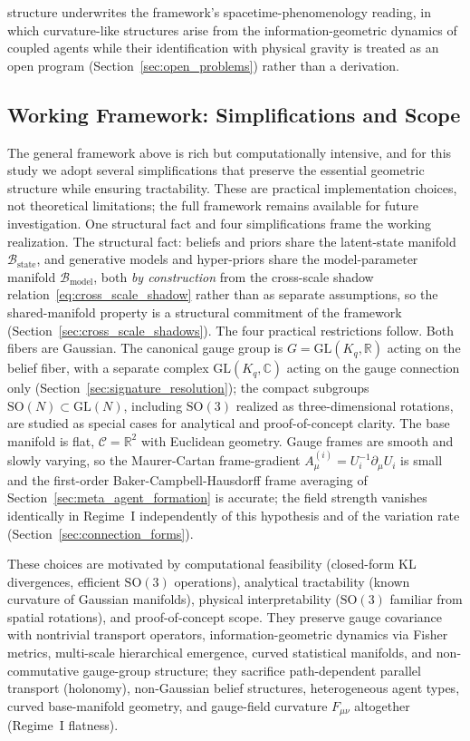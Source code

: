 \documentclass[11pt]{article}
\begin{document}
structure underwrites the framework's spacetime-phenomenology reading, in which curvature-like structures arise from the information-geometric dynamics of coupled agents while their identification with physical gravity is treated as an open program (Section~\ref{sec:open_problems}) rather than a derivation.

\subsection{Working Framework: Simplifications and Scope}
\label{sec:working_framework}

The general framework above is rich but computationally intensive, and for this study we adopt several simplifications that preserve the essential geometric structure while ensuring tractability. These are practical implementation choices, not theoretical limitations; the full framework remains available for future investigation. One structural fact and four simplifications frame the working realization. The structural fact: beliefs and priors share the latent-state manifold $\mathcal{B}_{\mathrm{state}}$, and generative models and hyper-priors share the model-parameter manifold $\mathcal{B}_{\mathrm{model}}$, both \emph{by construction} from the cross-scale shadow relation~\eqref{eq:cross_scale_shadow} rather than as separate assumptions, so the shared-manifold property is a structural commitment of the framework (Section~\ref{sec:cross_scale_shadows}). The four practical restrictions follow. Both fibers are Gaussian. The canonical gauge group is $G = \mathrm{GL}(K_q, \mathbb{R})$ acting on the belief fiber, with a separate complex $\mathrm{GL}(K_q, \mathbb{C})$ acting on the gauge connection only (Section~\ref{sec:signature_resolution}); the compact subgroups $\mathrm{SO}(N) \subset \mathrm{GL}(N)$, including $\mathrm{SO}(3)$ realized as three-dimensional rotations, are studied as special cases for analytical and proof-of-concept clarity. The base manifold is flat, $\mathcal{C} = \mathbb{R}^2$ with Euclidean geometry. Gauge frames are smooth and slowly varying, so the Maurer-Cartan frame-gradient $A^{(i)}_\mu = U_i^{-1}\partial_\mu U_i$ is small and the first-order Baker-Campbell-Hausdorff frame averaging of Section~\ref{sec:meta_agent_formation} is accurate; the field strength vanishes identically in Regime~I independently of this hypothesis and of the variation rate (Section~\ref{sec:connection_forms}).

These choices are motivated by computational feasibility (closed-form KL divergences, efficient $\mathrm{SO}(3)$ operations), analytical tractability (known curvature of Gaussian manifolds), physical interpretability ($\mathrm{SO}(3)$ familiar from spatial rotations), and proof-of-concept scope. They preserve gauge covariance with nontrivial transport operators, information-geometric dynamics via Fisher metrics, multi-scale hierarchical emergence, curved statistical manifolds, and non-commutative gauge-group structure; they sacrifice path-dependent parallel transport (holonomy), non-Gaussian belief structures, heterogeneous agent types, curved base-manifold geometry, and gauge-field curvature $F_{\mu\nu}$ altogether (Regime~I flatness).
\end{document}
